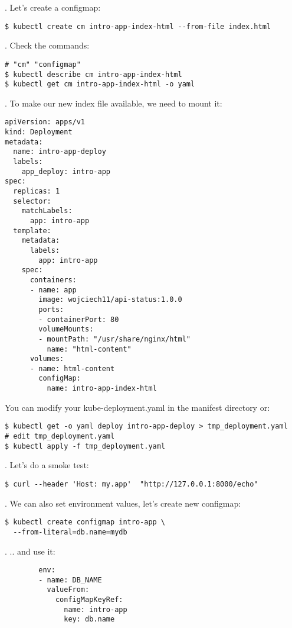 \documentclass[12pt, letterpaper]{article}
\begin{document}
. Let's create a configmap:

\begin{verbatim}
$ kubectl create cm intro-app-index-html --from-file index.html
\end{verbatim}

. Check the commands:

\begin{verbatim}
# "cm" "configmap"
$ kubectl describe cm intro-app-index-html
$ kubectl get cm intro-app-index-html -o yaml
\end{verbatim}

. To make our new index file available, we need to mount it:

\begin{verbatim}
apiVersion: apps/v1
kind: Deployment
metadata:
  name: intro-app-deploy
  labels:
    app_deploy: intro-app
spec:
  replicas: 1
  selector:
    matchLabels:
      app: intro-app
  template:
    metadata:
      labels:
        app: intro-app
    spec:
      containers:
      - name: app
        image: wojciech11/api-status:1.0.0
        ports:
        - containerPort: 80
        volumeMounts:
        - mountPath: "/usr/share/nginx/html"
          name: "html-content"
      volumes:
      - name: html-content
        configMap:
          name: intro-app-index-html
\end{verbatim}

You can modify your kube-deployment.yaml in the manifest directory or:
\begin{verbatim}
$ kubectl get -o yaml deploy intro-app-deploy > tmp_deployment.yaml
# edit tmp_deployment.yaml
$ kubectl apply -f tmp_deployment.yaml
\end{verbatim}

. Let's do a smoke test:

\begin{verbatim}
$ curl --header 'Host: my.app'  "http://127.0.0.1:8000/echo"
\end{verbatim}

. We can also set environment values, let's create new configmap:

\begin{verbatim}
$ kubectl create configmap intro-app \
  --from-literal=db.name=mydb
\end{verbatim}

. .. and use it:

\begin{verbatim}
        env:
        - name: DB_NAME
          valueFrom:
            configMapKeyRef:
              name: intro-app
              key: db.name
\end{verbatim}
\end{document}
